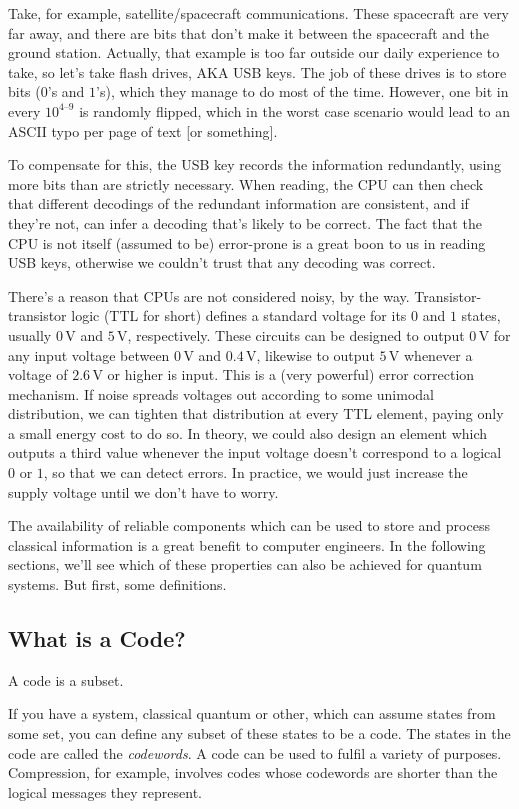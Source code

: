 \documentclass[10pt,a4paper, english]{scrartcl}
\providecommand{\volts}{\, \textrm{V}}
\begin{document}
Take, for example, satellite/spacecraft communications. 
These spacecraft are very far away, and there are bits that don't make it between the spacecraft and the ground station. 
Actually, that example is too far outside our daily experience to take, so let's take flash drives, AKA USB keys.
The job of these drives is to store bits ($0$'s and $1$'s), which they manage to do most of the time.
However, one bit in every $10^{4\text{--}9}$ is randomly flipped, which in the worst case scenario would lead to an ASCII typo per page of text [or something].

To compensate for this, the USB key records the information redundantly, using more bits than are strictly necessary.
When reading, the CPU can then check that different decodings of the redundant information are consistent, and if they're not, can infer a decoding that's likely to be correct. 
The fact that the CPU is not itself (assumed to be) error-prone is a great boon to us in reading USB keys, otherwise we couldn't trust that any decoding was correct. 

There's a reason that CPUs are not considered noisy, by the way.
Transistor-transistor logic (TTL for short) defines a standard voltage for its $0$ and $1$ states, usually $0 \volts$ and  $5 \volts$, respectively.
These circuits can be designed to output $0 \volts$ for any input voltage between $0 \volts$ and $0.4 \volts$, likewise to output $5 \volts$ whenever a voltage of $2.6 \volts$ or higher is input. 
This is a (very powerful) error correction mechanism. 
If noise spreads voltages out according to some unimodal distribution, we can tighten that distribution at every TTL element, paying only a small energy cost to do so. 
In theory, we could also design an element which outputs a third value whenever the input voltage doesn't correspond to a logical $0$ or $1$, so that we can detect errors. 
In practice, we would just increase the supply voltage until we don't have to worry. 

The availability of reliable components which can be used to store and process classical information is a great benefit to computer engineers.
In the following sections, we'll see which of these properties can also be achieved for quantum systems. 
But first, some definitions.
\subsection{What is a Code?}
A code is a subset. 

If you have a system, classical quantum or other, which can assume states from some set, you can define any subset of these states to be a code.
The states in the code are called the \emph{codewords}. 
A code can be used to fulfil a variety of purposes.
Compression, for example, involves codes whose codewords are shorter than the logical messages they represent.
\end{document}
